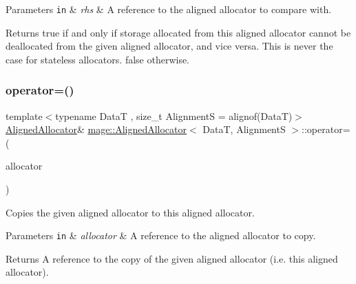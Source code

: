 \begin{DoxyParams}[1]{Parameters}
\mbox{\tt in}  & {\em rhs} & A reference to the aligned allocator to compare with. \\
\hline
\end{DoxyParams}
\begin{DoxyReturn}{Returns}
{\ttfamily true} if and only if storage allocated from this aligned allocator cannot be deallocated from the given aligned allocator, and vice versa. This is never the case for stateless allocators. {\ttfamily false} otherwise. 
\end{DoxyReturn}
\hypertarget{classmage_1_1_aligned_allocator_abff2de92167b6f602cdd9cbbffa316fe}{}\label{classmage_1_1_aligned_allocator_abff2de92167b6f602cdd9cbbffa316fe} 
\subsubsection{\texorpdfstring{operator=()}{operator=()}\hspace{0.1cm}{\footnotesize\ttfamily [1/2]}}
{\footnotesize\ttfamily template$<$typename DataT , size\+\_\+t AlignmentS = alignof(\+Data\+T)$>$ \\
\hyperlink{classmage_1_1_aligned_allocator}{Aligned\+Allocator}\& \hyperlink{classmage_1_1_aligned_allocator}{mage\+::\+Aligned\+Allocator}$<$ DataT, AlignmentS $>$\+::operator= (\begin{DoxyParamCaption}\item[{const \hyperlink{classmage_1_1_aligned_allocator}{Aligned\+Allocator}$<$ DataT, AlignmentS $>$ \&}]{allocator }\end{DoxyParamCaption})\hspace{0.3cm}{\ttfamily [delete]}}

Copies the given aligned allocator to this aligned allocator.


\begin{DoxyParams}[1]{Parameters}
\mbox{\tt in}  & {\em allocator} & A reference to the aligned allocator to copy. \\
\hline
\end{DoxyParams}
\begin{DoxyReturn}{Returns}
A reference to the copy of the given aligned allocator (i.\+e. this aligned allocator). 
\end{DoxyReturn}
\hypertarget{classmage_1_1_aligned_allocator_a2b4f00334e5c546b18285ddb02e44bd1}{}\label{classmage_1_1_aligned_allocator_a2b4f00334e5c546b18285ddb02e44bd1} 
